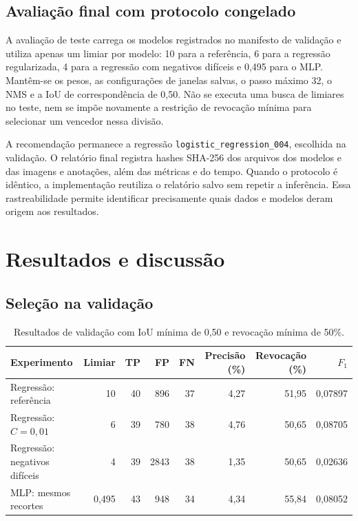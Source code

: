 \documentclass[12pt,a4paper,twocolumn]{article}
\begin{document}
\subsection{Avaliação final com protocolo congelado}
A avaliação de teste carrega os modelos registrados no manifesto de validação e utiliza apenas um limiar por modelo: 10 para a referência, 6 para a regressão regularizada, 4 para a regressão com negativos difíceis e 0,495 para o MLP. Mantêm-se os pesos, as configurações de janelas salvas, o passo máximo 32, o NMS e a IoU de correspondência de 0,50. Não se executa uma busca de limiares no teste, nem se impõe novamente a restrição de revocação mínima para selecionar um vencedor nessa divisão.

A recomendação permanece a regressão \texttt{logistic\_regression\_004}, escolhida na validação. O relatório final registra hashes SHA-256 dos arquivos dos modelos e das imagens e anotações, além das métricas e do tempo. Quando o protocolo é idêntico, a implementação reutiliza o relatório salvo sem repetir a inferência. Essa rastreabilidade permite identificar precisamente quais dados e modelos deram origem aos resultados.

\section{Resultados e discussão}
\subsection{Seleção na validação}

\begin{table}[t]
\centering\small
\caption{Resultados de validação com IoU mínima de 0,50 e revocação mínima de 50\%.}
\label{tab:resultados}
\begin{tabular}{lrrrrrrr}\toprule
Experimento & Limiar & TP & FP & FN & Precisão (\%) & Revocação (\%) & $F_1$\\\midrule
Regressão: referência & 10 & 40 & 896 & 37 & 4,27 & 51,95 & 0,07897\\
Regressão: $C=0{,}01$ & 6 & 39 & 780 & 38 & 4,76 & 50,65 & 0,08705\\
Regressão: negativos difíceis & 4 & 39 & 2843 & 38 & 1,35 & 50,65 & 0,02636\\
MLP: mesmos recortes & 0,495 & 43 & 948 & 34 & 4,34 & 55,84 & 0,08052\\\bottomrule
\end{tabular}
\end{table}
\end{document}
